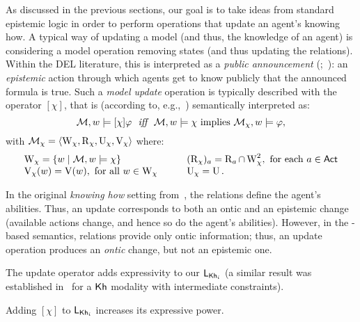 
As discussed in the previous sections, our goal is to take ideas from standard epistemic logic in order to perform operations that update an agent's knowing how.
A typical way of updating a model (and thus, the knowledge of an agent) 
is considering a model operation removing states (and thus updating the relations). Within the DEL literature, this is interpreted as a \emph{public announcement} (\PAL;~\cite{Plaza89:lopc}): an \emph{epistemic} action through which agents get to know publicly that the announced formula is true. Such a \emph{model update} operation is typically described with the operator $[\chi]$, that is (according to, e.g.,~\cite{DELbook}) semantically interpreted as:
\[
\modults,w\models[\chi]\varphi \ \ \iff \ \  \modults,w\models\chi \mbox{ implies } \modults_{\chi},w\models\varphi,
\]
with $\mathcal{M}_\chi=\langle \operatorname{W}_\chi,\operatorname{R}_\chi,\operatorname{U}_\chi,\operatorname{V}_\chi \rangle$ where:
\[
\begin{array}{l@{\quad \quad \quad }l}
\W_\chi = \set{w \mid \modults,w\models\chi} & (\R_\chi)_a = \R_a \cap \W_\chi^2, \mbox{ for each } a\in\ACT \\
\V_\chi(w) = \V(w), \mbox{ for all } w\in\W_\chi & \Unc_\chi = \Unc.
\end{array}	
\]

In the original \emph{knowing how} setting from~\cite{Wang15lori}, the relations define the agent's abilities. Thus, an update corresponds to both an ontic and an epistemic change (available actions change, and hence so do the agent's abilities). However, in the \ults-based semantics, relations provide only ontic information; thus, an update operation produces an \emph{ontic} change, but not an epistemic one.

The update operator adds expressivity to our $\mathsf{L}_{{\sf Kh}_i}$ (a similar result was established in~\cite{Wang2016} for a ${\sf Kh}$ modality with intermediate constraints).

\medskip 

\begin{proposition}\label{prop:pal-exp}
Adding $[\chi]$ to $\mathsf{L}_{{\sf Kh}_i}$ increases its expressive power.
\end{proposition}

